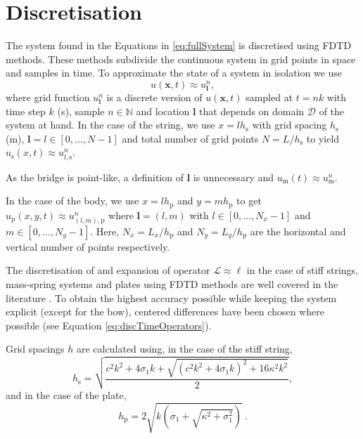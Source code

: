 \documentclass[dvipsnames, pdftex]{article}
\begin{document}
\section{Discretisation}\label{sec:disc}
The system found in the Equations in \eqref{eq:fullSystem} is discretised using FDTD methods. These methods subdivide the continuous system in grid points in space and samples in time. To approximate the state of a system in isolation we use
\begin{equation}\label{eq:generalDisc}
    u(\boldsymbol{x},t) \approx u^n_{\boldsymbol{l}}, 
\end{equation} 
where grid function $u^n_{\boldsymbol{l}}$ is a discrete version of $u({\boldsymbol{x}},t)$ sampled at $t=nk$ with time step $k$ (s), sample $n \in \mathbb{N}$ and location $\boldsymbol{l}$ that depends on domain $\mathcal{D}$ of the system at hand. In the case of the string, we use $x=lh_\text{s}$ with grid spacing $h_\text{s}$ (m), $\boldsymbol{l} = l \in [0,\hdots, N-1]$ and total number of grid points $N=L/h_\text{s}$ to yield $u_\text{s}(x,t) \approx u_{l,\text{s}}^n$. 

As the bridge is point-like, a definition of $\boldsymbol{l}$ is unnecessary and $u_\text{m}(t) \approx u_\text{m}^n$. 

In the case of the body, we use $x=lh_\text{p}$ and $y=mh_\text{p}$ to get $u_\text{p}(x, y, t) \approx u_{(l,m),\text{p}}^n$ where $\boldsymbol{l} = (l,m)$ with $l\in[0,\hdots,N_x-1]$ and $m\in[0,\hdots,N_y-1]$. Here, $N_x = L_x / h_\text{p}$ and $N_y = L_y / h_\text{p}$ are the horizontal and vertical number of points respectively.

 
The discretisation of and expansion of operator $\mathcal{L}\approx \ell$ in the case of stiff strings, mass-spring systems and plates using FDTD methods are well covered in the literature \cite{Bilbao2009:NumericalSoundSynthesis}. To obtain the highest accuracy possible while keeping the system explicit (except for the bow), centered differences have been chosen where possible (see Equation \eqref{eq:discTimeOperators}). 

Grid spacings $h$ are calculated using, in the case of the stiff string,
\begin{equation}
    h_\text{s} = \sqrt{\frac{c^2k^2+4\sigma_1k+\sqrt{(c^2k^2+4\sigma_1k)^2+16\kappa^2k^2}}{2}},
\end{equation}
and in the case of the plate,
\begin{equation}
    h_\text{p} = 2\sqrt{k\left(\sigma_1 + \sqrt{\kappa^2 + \sigma_1^2}\right)}\ .
\end{equation}
\end{document}
